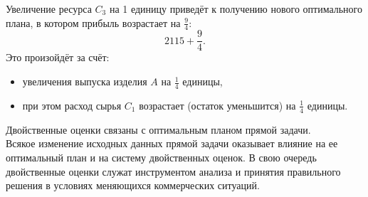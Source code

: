 \documentclass[17pt]{extarticle}
\begin{document}
Увеличение ресурса \( C_3 \) на 1 единицу приведёт к получению нового оптимального плана, в котором прибыль возрастает на \( \frac{9}{4} \):
\[
    2115 + \frac{9}{4}.
\]
Это произойдёт за счёт:
\begin{itemize}
    \item увеличения выпуска изделия \( A \) на \( \frac{1}{4} \) единицы,
    \item при этом расход сырья \( C_1 \) возрастает (остаток уменьшится) на \( \frac{1}{4} \) единицы.
\end{itemize}

Двойственные оценки связаны с оптимальным
планом прямой задачи. \\ Всякое изменение исходных
данных прямой задачи оказывает влияние на ее
оптимальный план и на систему двойственных
оценок.
В свою очередь двойственные оценки служат
инструментом анализа и принятия правильного
решения в условиях меняющихся коммерческих
ситуаций.
\end{document}
